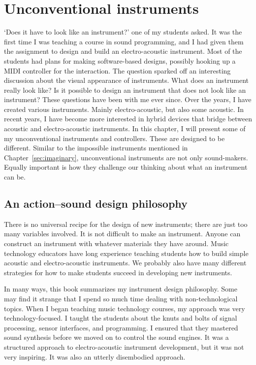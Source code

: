 \chapter{Unconventional instruments}\label{chap:unconventional}

`Does it have to look like an instrument?' one of my students asked. It was the first time I was teaching a course in sound programming, and I had given them the assignment to design and build an electro-acoustic instrument. Most of the students had plans for making software-based designs, possibly hooking up a MIDI controller for the interaction. The question sparked off an interesting discussion about the visual appearance of instruments. What does an instrument really look like? Is it possible to design an instrument that does not look like an instrument? These questions have been with me ever since. Over the years, I have created various instruments. Mainly electro-acoustic, but also some acoustic. In recent years, I have become more interested in hybrid devices that bridge between acoustic and electro-acoustic instruments. In this chapter, I will present some of my unconventional instruments and controllers. These are designed to be different. Similar to the impossible instruments mentioned in Chapter~\ref{sec:imaginary}, unconventional instruments are not only sound-makers. Equally important is how they challenge our thinking about what an instrument can be.


\section{An action--sound design philosophy}

There is no universal recipe for the design of new instruments; there are just too many variables involved. It is not difficult to make an instrument. Anyone can construct an instrument with whatever materials they have around. Music technology educators have long experience teaching students how to build simple acoustic and electro-acoustic instruments. We probably also have many different strategies for how to make students succeed in developing new instruments.

In many ways, this book summarizes my instrument design philosophy. Some may find it strange that I spend so much time dealing with non-technological topics. When I began teaching music technology courses, my approach was very technology-focused. I taught the students about the knuts and bolts of signal processing, sensor interfaces, and programming. I ensured that they mastered sound synthesis before we moved on to control the sound engines. It was a structured approach to electro-acoustic instrument development, but it was not very inspiring. It was also an utterly disembodied approach.


